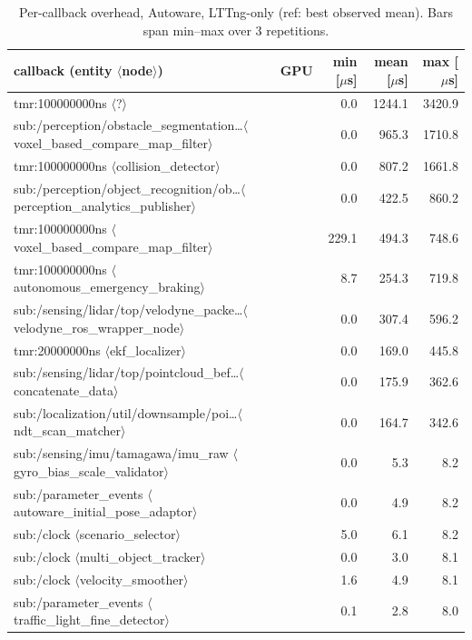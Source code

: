 \begin{table}[t]\centering\scriptsize
\caption{Per-callback overhead, Autoware, LTTng-only (ref: best observed mean). Bars span min--max over 3 repetitions.}\label{tab:cbov-aw-lttng}
\begin{tabular}{llrrr}
\toprule
callback (entity $\langle$node$\rangle$) & GPU & min [$\mu$s] & mean [$\mu$s] & max [$\mu$s] \\
\midrule
tmr:100000000ns $\langle$?$\rangle$ &  & 0.0 & 1244.1 & 3420.9 \\
sub:/perception/obstacle\_segmentation\dots $\langle$voxel\_based\_compare\_map\_filter$\rangle$ &  & 0.0 & 965.3 & 1710.8 \\
tmr:100000000ns $\langle$collision\_detector$\rangle$ &  & 0.0 & 807.2 & 1661.8 \\
sub:/perception/object\_recognition/ob\dots $\langle$perception\_analytics\_publisher$\rangle$ &  & 0.0 & 422.5 & 860.2 \\
tmr:100000000ns $\langle$voxel\_based\_compare\_map\_filter$\rangle$ &  & 229.1 & 494.3 & 748.6 \\
tmr:100000000ns $\langle$autonomous\_emergency\_braking$\rangle$ &  & 8.7 & 254.3 & 719.8 \\
sub:/sensing/lidar/top/velodyne\_packe\dots $\langle$velodyne\_ros\_wrapper\_node$\rangle$ &  & 0.0 & 307.4 & 596.2 \\
tmr:20000000ns $\langle$ekf\_localizer$\rangle$ &  & 0.0 & 169.0 & 445.8 \\
sub:/sensing/lidar/top/pointcloud\_bef\dots $\langle$concatenate\_data$\rangle$ &  & 0.0 & 175.9 & 362.6 \\
sub:/localization/util/downsample/poi\dots $\langle$ndt\_scan\_matcher$\rangle$ &  & 0.0 & 164.7 & 342.6 \\
\midrule
sub:/sensing/imu/tamagawa/imu\_raw $\langle$gyro\_bias\_scale\_validator$\rangle$ &  & 0.0 & 5.3 & 8.2 \\
sub:/parameter\_events $\langle$autoware\_initial\_pose\_adaptor$\rangle$ &  & 0.0 & 4.9 & 8.2 \\
sub:/clock $\langle$scenario\_selector$\rangle$ &  & 5.0 & 6.1 & 8.2 \\
sub:/clock $\langle$multi\_object\_tracker$\rangle$ &  & 0.0 & 3.0 & 8.1 \\
sub:/clock $\langle$velocity\_smoother$\rangle$ &  & 1.6 & 4.9 & 8.1 \\
sub:/parameter\_events $\langle$traffic\_light\_fine\_detector$\rangle$ &  & 0.1 & 2.8 & 8.0 \\

\end{tabular}
\end{table}
